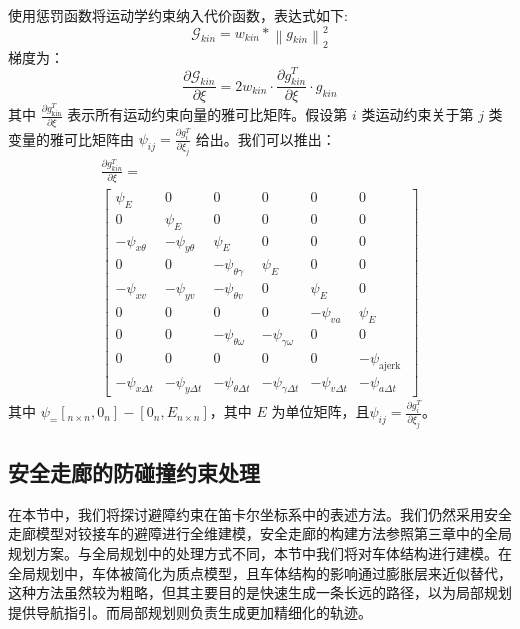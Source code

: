 \documentclass[master,academic]{ysuthesis} %
\begin{document}
		使用惩罚函数将运动学约束纳入代价函数，表达式如下:
		\begin{equation}
			\mathcal{G}_{kin} = w_{kin}*\left \| g_{kin} \right \|_2^2 \label{Gkin}
		\end{equation}
		梯度为：
		\begin{equation}
			\frac{\partial\mathcal{G}_{kin}}{\partial\xi}=2w_{kin}\cdot\frac{\partial g_{kin}^T}{\partial\xi}\cdot g_{kin}\label{18}
		\end{equation}
		其中 \(\frac{\partial g_{\text{kin}}^T}{\partial \xi}\) 表示所有运动约束向量的雅可比矩阵。假设第 \(i\) 类运动约束关于第 \(j\) 类变量的雅可比矩阵由 \(\psi_{ij} = \frac{\partial g^T_{i}}{\partial \xi_j}\) 给出。我们可以推出：
		\begin{equation}
			\begin{array}{c}
				\frac{\partial g_{k i n}^{T}}{\partial \xi}= \\
				{\left[\begin{array}{cccccc}
						\psi_{E} & 0 & 0 & 0 & 0 & 0 \\
						0 & \psi_{E} & 0 & 0 & 0 & 0 \\
						-\psi_{x \theta} & -\psi_{y \theta} & \psi_{E} & 0 & 0 & 0 \\
						0 & 0 & -\psi_{\theta \gamma} & \psi_{E} & 0 & 0 \\
						-\psi_{x v} & -\psi_{y v} & -\psi_{\theta v} & 0 & \psi_{E} & 0 \\
						0 & 0 & 0 & 0 & -\psi_{v a} & \psi_{E} \\
						0 & 0 & -\psi_{\theta \omega} & -\psi_{\gamma \omega} & 0 & 0 \\
						0 & 0 & 0 & 0 & 0 & -\psi_{\text {ajerk }} \\
						-\psi_{x \Delta t} & -\psi_{y \Delta t} & -\psi_{\theta \Delta t} & -\psi_{\gamma \Delta t} & -\psi_{v \Delta t} & -\psi_{a \Delta t}
					\end{array}\right]}
			\end{array}
			\label{eq:运动学约束的雅可比}
		\end{equation}
		其中 $\psi _ = [_{n \times n}, 0_n] - [0_n, E_{n \times n}]$，其中 $E$ 为单位矩阵，且\(\psi_{ij} = \frac{\partial g^T_{i}}{\partial \xi_j}\)。

		\subsection{安全走廊的防碰撞约束处理}
		在本节中，我们将探讨避障约束在笛卡尔坐标系中的表述方法。我们仍然采用安全走廊模型对铰接车的避障进行全维建模，安全走廊的构建方法参照第三章中的全局规划方案。与全局规划中的处理方式不同，本节中我们将对车体结构进行建模。在全局规划中，车体被简化为质点模型，且车体结构的影响通过膨胀层来近似替代，这种方法虽然较为粗略，但其主要目的是快速生成一条长远的路径，以为局部规划提供导航指引。而局部规划则负责生成更加精细化的轨迹。
\end{document}

